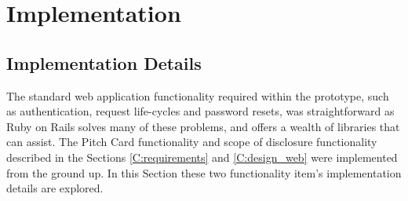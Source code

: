 \chapter{Implementation}\label{C:webApplicationImplementation}

\section{Implementation Details}
The standard web application functionality required within the prototype, such as authentication, request life-cycles and password resets, was straightforward as Ruby on Rails solves many of these problems, and offers a wealth of libraries that can assist. The Pitch Card functionality and scope of disclosure functionality described in the Sections \ref{C:requirements} and \ref{C:design_web} were implemented from the ground up. In this Section these two functionality item's implementation details are explored.

